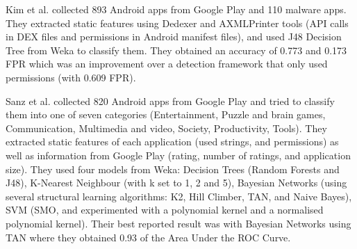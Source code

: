 Kim et al. \cite{kim_malicious} collected 893 Android apps from Google Play and 110 malware apps. They extracted static features using Dedexer and AXMLPrinter tools (API calls in DEX files and permissions in Android manifest files), and used J48 Decision Tree from Weka to classify them. They obtained an accuracy of 0.773 and 0.173 FPR which was an improvement over a detection framework that only used permissions (with 0.609 FPR).

Sanz et al. \cite{sanz_2012} collected 820 Android apps from Google Play and tried to classify them into one of seven categories (Entertainment, Puzzle and brain games, Communication, Multimedia and video, Society, Productivity, Tools). They extracted static features of each application (used strings, and permissions) as well as information from Google Play (rating, number of ratings, and application size). They used four models from Weka: Decision Trees (Random Forests and J48), K-Nearest Neighbour (with k set to 1, 2 and 5), Bayesian Networks (using several structural learning algorithms: K2, Hill Climber, TAN, and Naive Bayes), SVM (SMO, and experimented with a polynomial kernel and a normalised polynomial kernel). Their best reported result was with Bayesian Networks using TAN where they obtained 0.93 of the Area Under the ROC Curve. 